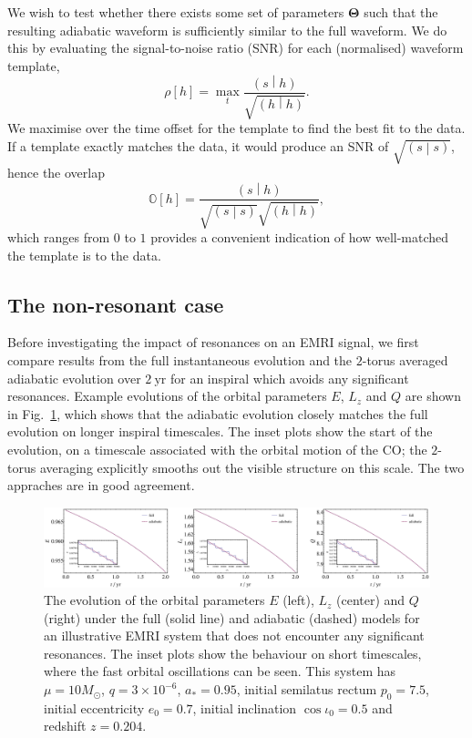 \documentclass[aps,prd,amsfonts,amssymb,amsmath,nofootinbib,showpacs,superscriptaddress,twocolumn]{revtex4}
\newcommand{\figref}[1]{Fig.~\ref{fig:#1}}
\newcommand{\overlap}[2]{\ensuremath{\left(#1\middle|#2\right)}}
\begin{document}
We wish to test whether there exists some set of parameters $\boldsymbol{\Theta}$ such that the resulting adiabatic waveform is sufficiently similar to the full waveform. We do this by evaluating the signal-to-noise ratio (SNR) for each (normalised) waveform template,
\begin{equation}
\rho\left[h\right] = \max_t \frac{\overlap{s}{h}}{\sqrt{\overlap{h}{h}}}.
\end{equation}
We maximise over the time offset for the template to find the best fit to the data. If a template exactly matches the data, it would produce an SNR of $\sqrt{\overlap{s}{s}}$, hence the overlap
\begin{equation}
\label{eq:overlap}
\mathbb{O}\left[h\right] = \frac{\overlap{s}{h}}{\sqrt{\overlap{s}{s}}\sqrt{\overlap{h}{h}}},
\end{equation}
which ranges from $0$ to $1$ provides a convenient indication of how well-matched the template is to the data.

\subsection{The non-resonant case}
\label{sec:nonres}

Before investigating the impact of resonances on an EMRI signal, we first compare results from the full instantaneous evolution and the $2$-torus averaged adiabatic evolution over $2~\mathrm{yr}$ for an inspiral which avoids any significant resonances. Example evolutions of the orbital parameters $E$, $L_z$ and $Q$ are shown in \figref{good-traj}, which shows that the adiabatic evolution closely matches the full evolution on longer inspiral timescales. The inset plots show the start of the evolution, on a timescale associated with the orbital motion of the CO; the $2$-torus averaging explicitly smooths out the visible structure on this scale. The two appraches are in good agreement.

\begin{figure}
\centering
\includegraphics[width=\textwidth]{Fig_good_traj}
\caption{\label{fig:good-traj}The evolution of the orbital parameters $E$ (left), $L_z$ (center) and $Q$ (right) under the full (solid line) and adiabatic (dashed) models for an illustrative EMRI system that does not encounter any significant resonances. The inset plots show the behaviour on short timescales, where the fast orbital oscillations can be seen. This system has $\mu = 10 M_{\odot}$, $q = 3\times 10^{-6}$, $a_\ast=0.95$, initial semilatus rectum $p_0 = 7.5$, initial eccentricity $e_0 = 0.7$, initial inclination $\cos \iota_0 = 0.5$ and redshift $z=0.204$.}
\end{figure}
\end{document}
